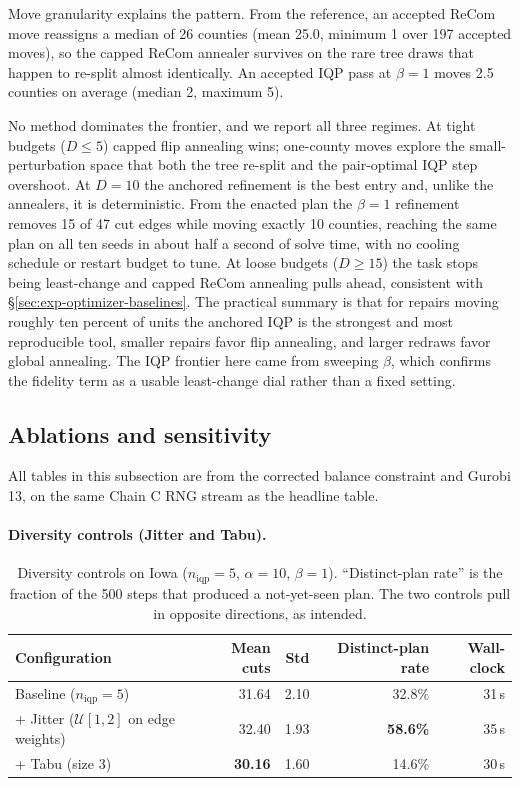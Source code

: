 \documentclass[11pt]{article}
\begin{document}
Move granularity explains the pattern. From the reference, an
accepted ReCom move reassigns a median of 26 counties (mean 25.0,
minimum 1 over 197 accepted moves), so the capped ReCom annealer
survives on the rare tree draws that happen to re-split almost
identically. An accepted IQP pass at $\beta = 1$ moves 2.5 counties
on average (median 2, maximum 5).

No method dominates the frontier, and we report all three regimes.
At tight budgets ($D \le 5$) capped flip annealing wins; one-county
moves explore the small-perturbation space that both the tree
re-split and the pair-optimal IQP step overshoot. At $D = 10$ the
anchored refinement is the best entry and, unlike the annealers, it
is deterministic. From the enacted plan the $\beta = 1$ refinement
removes 15 of 47 cut edges while moving exactly 10 counties, reaching
the same plan on all ten seeds in about half a second of solve time,
with no cooling schedule or restart budget to tune. At loose budgets
($D \ge 15$) the task stops being least-change and capped ReCom
annealing pulls ahead, consistent with
\S\ref{sec:exp-optimizer-baselines}. The practical summary is that
for repairs moving roughly ten percent of units the anchored IQP is
the strongest and most reproducible tool, smaller repairs favor flip
annealing, and larger redraws favor global annealing. The IQP
frontier here came from sweeping $\beta$, which confirms the fidelity
term as a usable least-change dial rather than a fixed setting.

\subsection{Ablations and sensitivity}\label{sec:exp-ablations}

All tables in this subsection are from the corrected balance
constraint and Gurobi 13, on the same Chain C RNG stream as the
headline table.

\paragraph{Diversity controls (Jitter and Tabu).}\label{sec:exp-diversity}

\begin{table}[H]
\centering
\small
\begin{tabular}{lrrrr}
\toprule
Configuration & Mean cuts & Std & Distinct-plan rate & Wall-clock \\
\midrule
Baseline ($n_{\mathrm{iqp}} = 5$)               & 31.64 & 2.10 & 32.8\% & 31\,s \\
+ Jitter ($\mathcal{U}[1,2]$ on edge weights)   & 32.40 & 1.93 & \textbf{58.6\%} & 35\,s \\
+ Tabu (size 3)                                  & \textbf{30.16} & 1.60 & 14.6\% & 30\,s \\
\bottomrule
\end{tabular}
\caption{Diversity controls on Iowa ($n_{\mathrm{iqp}} = 5$,
  $\alpha = 10$, $\beta = 1$). ``Distinct-plan rate'' is the fraction
  of the 500 steps that produced a not-yet-seen plan. The two
  controls pull in opposite directions, as intended.}\label{tab:diversity-iowa}
\end{table}
\end{document}
